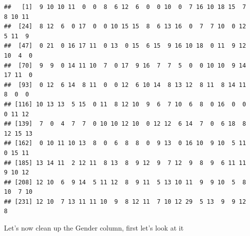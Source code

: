 \documentclass[]{book}
\newenvironment{Shaded}{\begin{snugshade}}{\end{snugshade}}
\newcommand{\CommentTok}[1]{\textcolor[rgb]{0.56,0.35,0.01}{\textit{#1}}}
\newcommand{\OperatorTok}[1]{\textcolor[rgb]{0.81,0.36,0.00}{\textbf{#1}}}
\newcommand{\NormalTok}[1]{#1}
\theoremstyle{definition}
\theoremstyle{definition}
\theoremstyle{definition}
\theoremstyle{remark}
\begin{document}
\begin{verbatim}
##   [1]  9 10 10 11  0  0  8  6 12  6  0  0 10  0  7 16 10 18 15  7  8 10 11
##  [24]  8 12  6  0 17  0  0 10 15 15  8  6 13 16  0  7  7 10  0 12  5 11  9
##  [47]  0 21  0 16 17 11  0 13  0 15  6 15  9 16 10 18  0 11  9 12 10  4  0
##  [70]  9  9  0 14 11 10  7  0 17  9 16  7  7  5  0  0 10 10  9 14 17 11  0
##  [93]  0 12  6 14  8 11  0  0 12  6 10 14  8 13 12  8 11  8 14 11  8  0  0
## [116] 10 13 13  5 15  0 11  8 12 10  9  6  7 10  6  8  0 16  0  0  0 11 12
## [139]  7  0  4  7  7  0 10 10 12 10  0 12 12  6 14  7  0  6 18  8 12 15 13
## [162]  0 10 11 10 13  8  0  6  8  8  0  9 13  0 16 10  9 10  5 11  0 15 11
## [185] 13 14 11  2 12 11  8 13  8  9 12  9  7 12  9  8  9  6 11 11  9 10 12
## [208] 12 10  6  9 14  5 11 12  8  9 11  5 13 10 11  9  9 10  5  8 10  7 10
## [231] 12 10  7 13 11 11 10  9  8 12 11  7 10 12 29  5 13  9  9 12  8
\end{verbatim}

Let's now clean up the Gender column, first let's look at it

\begin{Shaded}
\end{Shaded}
\end{document}
